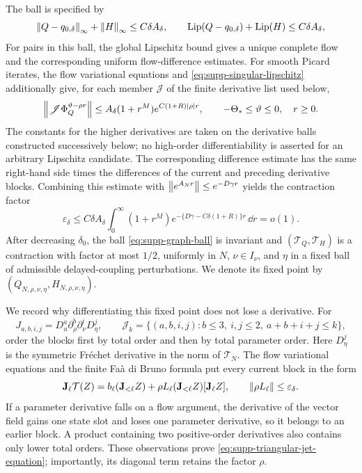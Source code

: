 The ball is specified by
\begin{equation}
 \left\lVert Q-q_{0,\delta}\right\rVert_\infty+\left\lVert H\right\rVert_\infty
 \le C\delta A_\delta,\qquad
 \operatorname{Lip}(Q-q_{0,\delta})+\operatorname{Lip}(H)
 \le C\delta A_\delta,
 \label{eq:supp-graph-ball}
\end{equation}
For pairs in this ball, the global Lipschitz bound gives a unique complete
flow and the corresponding uniform flow-difference estimates.  For smooth
Picard iterates, the flow variational equations and
\eqref{eq:supp-singular-lipschitz} additionally give, for each member
\(\mathscr J\) of the finite derivative list used below,
\begin{equation}
 \left\lVert\mathscr J\Phi_Q^{\vartheta-\rho r}\right\rVert
 \le A_\delta(1+r^M)e^{C(1+R)\left\lvert\rho\right\rvert r},
 \qquad -\Theta_*\le\vartheta\le0,\quad r\ge0.
 \label{eq:supp-flow-jet-bound}
\end{equation}
The constants for the higher derivatives are taken on the derivative balls
constructed successively below; no high-order differentiability is asserted
for an arbitrary Lipschitz candidate.  The corresponding difference estimate
has the same right-hand side times the differences of the current and
preceding derivative blocks.  Combining
this estimate with
\(\left\lVert e^{A_Nr}\right\rVert\le e^{-D\gamma r}\) yields the contraction factor
\begin{equation}
 \varepsilon_\delta
 \le C\delta A_\delta
   \int_0^\infty(1+r^M)
      e^{-\{D\gamma-C\delta(1+R)\}r}\,\dd r=o(1).
 \label{eq:supp-graph-contraction}
\end{equation}
After decreasing \(\delta_0\), the ball
\eqref{eq:supp-graph-ball} is invariant and
\((\mathcal T_Q,\mathcal T_H)\) is a contraction with factor at most
\(1/2\), uniformly in \(N\), \(\nu\in I_\nu\), and \(\eta\) in a fixed ball
of admissible delayed-coupling perturbations.  We denote its fixed point by
\((Q_{N,\rho,\nu,\eta},H_{N,\rho,\nu,\eta})\).

We record why differentiating this fixed point does not lose a derivative.
For
\begin{equation}
 J_{a,b,i,j}=D_u^a\partial_\rho^b\partial_\nu^iD_\eta^j,\qquad
 \mathcal J_k=\{(a,b,i,j):b\le3,\ i,j\le2,\
                         a+b+i+j\le k\},
 \label{eq:supp-jet-list}
\end{equation}
order the blocks first by total order and then by total parameter order.
Here \(D_\eta^j\) is the symmetric Fr\'echet derivative in the norm of
\(\mathcal T_N\).  The flow variational equations and the
finite Fa\`a di Bruno formula put every current block in the form
\begin{equation}
 \mathbf J_\ell\mathcal T(Z)
 =b_\ell(\mathbf J_{<\ell}Z)
  +\rho L_\ell(\mathbf J_{<\ell}Z)[\mathbf J_\ell Z],
 \qquad \left\lVert\rho L_\ell\right\rVert\le\varepsilon_\delta.
 \label{eq:supp-triangular-jet-equation}
\end{equation}
If a parameter derivative falls on a flow argument, the derivative of the
vector field gains one state slot and loses one parameter derivative, so it
belongs to an earlier block.  A product containing two positive-order derivatives
also contains only lower total orders.  These observations prove
\eqref{eq:supp-triangular-jet-equation}; importantly, its diagonal term
retains the factor \(\rho\).

